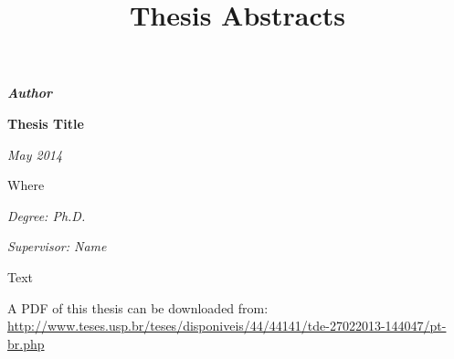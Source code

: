 \documentclass[a4paper]{article}
\begin{document}
\title{Thesis Abstracts}




\maketitle




\begin{center}
\textit{\textbf{Author}}

\textbf{Thesis Title}

\vspace{2pt}
\textit{May 2014}

{\small Where}
\vspace{4pt}

\textit{Degree: Ph.D.}

\textit{Supervisor: Name }
\end{center}
\vspace*{8pt}

Text

A PDF of this thesis can be downloaded from:
\url{http://www.teses.usp.br/teses/disponiveis/44/44141/tde-27022013-144047/pt-br.php}

\vspace*{16pt}
\end{document}
